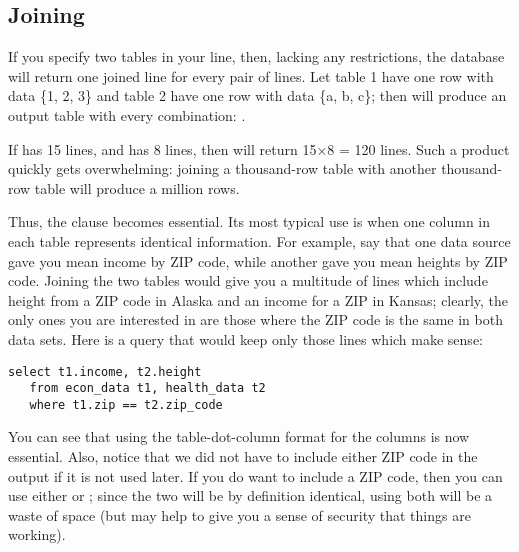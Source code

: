 \subsection{Joining}
If you specify two tables in your  line, then, lacking any
restrictions, the database will return one joined line for every pair of lines.
Let table 1 have one row with data \{1, 2, 3\} and table 2 have one row
with data \{a, b, c\}; then  will
produce an output table with every combination:
. 

If  has 15 lines, and  has 8 lines, then
 will return 15$\times$8 = 120 lines.
Such a product quickly gets overwhelming: joining a thousand-row table
with another thousand-row table will produce a million rows.

Thus, the  clause becomes essential. Its most typical use is
when one column in each table represents identical information. For
example, say that one data source gave you mean income by ZIP code,
while another gave you mean heights by ZIP code. Joining the two tables
would give you a multitude of lines which include height from a ZIP code
in Alaska and an income for a ZIP in Kansas; clearly, the only ones you
are interested in are those where the ZIP code is the same in both data
sets. Here is a query that would keep only those lines which make
sense:

\begin{lstlisting}
select t1.income, t2.height
   from econ_data t1, health_data t2
   where t1.zip == t2.zip_code
\end{lstlisting}

You can see that using the table-dot-column format for the columns is now
essential. Also, notice that we did not have to include either ZIP code
in the output if it is not used later. If you do want to include a ZIP
code, then you can use either  or ; since
the two will be by definition identical, using both will be a waste of
space (but may help to give you a sense of security that things are working).

